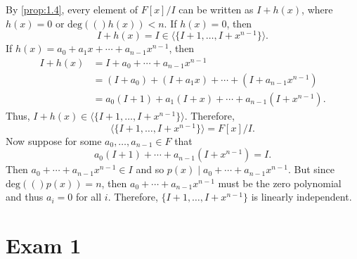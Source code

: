 \documentclass{article}
\makeatletter
\newcommand{\deg}[1]{\text{deg}(#1)}
\theoremstyle{definition}
\theoremstyle{remark}
\let\oldproofname=\proofname
\renewcommand{\proofname}{\textit{\oldproofname}}
\theoremstyle{definition}
\renewenvironment{proof}[1][\proofname]{\par
  \pushQED{\qed}%
  \normalfont \topsep6\p@\@plus6\p@\relax
  \list{}{\leftmargin=0mm
          \rightmargin=0mm
          \settowidth{\itemindent}{\itshape#1}%
          \labelwidth=\itemindent
          \parsep=0pt \listparindent=0mm%
  }
  \item[\hskip\labelsep
        \itshape
    #1\@addpunct{.}]\ignorespaces
}{%
  \popQED\endlist\@endpefalse
}
\makeatother
\begin{document}
        \begin{proof}
            By \cref{prop:1.4}, every element of $F[x]/I$ can be written as $I+h(x)$, where $h(x)=0$ or $\deg(h(x))<n$. If $h(x)=0$, then
                \begin{equation*}
                    I+h(x)=I\in\langle\{I+1,\dots,I+x^{n-1}\}\rangle.
                \end{equation*}
            If $h(x)=a_0+a_1x+\cdots+a_{n-1}x^{n-1}$, then 
                \begin{equation*}
                    \begin{split}
                        I+h(x)&=I+a_0+\cdots+a_{n-1}x^{n-1} \\
                        &=(I+a_0)+(I+a_1x)+\cdots+(I+a_{n-1}x^{n-1}) \\
                        &=a_0(I+1)+a_1(I+x)+\cdots+a_{n-1}(I+x^{n-1}).
                    \end{split}
                \end{equation*}
            Thus, $I+h(x)\in\langle\{I+1,\dots,I+x^{n-1}\}\rangle$. Therefore,
                \begin{equation*}
                    \langle\{I+1,\dots,I+x^{n-1}\}\rangle=F[x]/I.
                \end{equation*}
            Now suppose for some $a_0,\dots,a_{n-1}\in F$ that 
                \begin{equation*}
                    a_0(I+1)+\cdots+a_{n-1}(I+x^{n-1})=I.
                \end{equation*}
            Then $a_0+\cdots+a_{n-1}x^{n-1}\in I$ and so $p(x)\mid a_0+\cdots+a_{n-1}x^{n-1}$. But since $\deg(p(x))=n$, then $a_0+\cdots+a_{n-1}x^{n-1}$ must be the zero polynomial and thus $a_i=0$ for all $i$. Therefore, $\{I+1,\dots,I+x^{n-1}\}$ is linearly independent.
        \end{proof}
\section{Exam 1}
\end{document}
